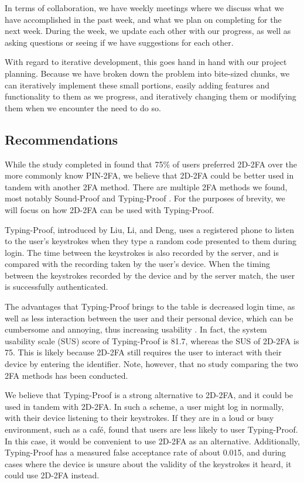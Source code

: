 \documentclass[11pt]{article}
\begin{document}
In terms of collaboration, we have weekly meetings where we discuss what
we have accomplished in the past week, and what we plan on completing
for the next week. During the week, we update each other with our
progress, as well as asking questions or seeing if we have suggestions
for each other. 

With regard to iterative development, this goes hand in hand with our
project planning. Because we have broken down the problem into
bite-sized chunks, we can iteratively implement these small portions,
easily adding features and functionality to them as we progress, and
iteratively changing them or modifying them when we encounter the need
to do so.

\subsection{Recommendations}

While the study completed in \cite{shirvanian2d2fa} found that 75\% of
users preferred 2D-2FA over the more commonly know PIN-2FA, we believe
that 2D-2FA could be better used in tandem with another 2FA method.
There are multiple 2FA methods we found, most notably Sound-Proof
\cite{soundProof} and Typing-Proof \cite{liuTypingProof}. For the
purposes of brevity, we will focus on how 2D-2FA can be used with
Typing-Proof. 

Typing-Proof, introduced by Liu, Li, and Deng, uses a registered phone
to listen to the user's keystrokes when they type a random code
presented to them during login. The time between the keystrokes is also
recorded by the server, and is compared with the recording taken by the
user's device. When the timing between the keystrokes recorded by the
device and by the server match, the user is successfully authenticated. 

The advantages that Typing-Proof brings to the table is decreased login
time, as well as less interaction between the user and their personal
device, which can be cumbersome and annoying, thus increasing usability
\cite{liuTypingProof}. In fact, the system usability scale (SUS) score
of Typing-Proof is 81.7, whereas the SUS of 2D-2FA is 75. This is likely
because 2D-2FA still requires the user to interact with their device by
entering the identifier. Note, however, that no study comparing the two
2FA methods has been conducted.  

We believe that Typing-Proof is a strong alternative to 2D-2FA, and it
could be used in tandem with 2D-2FA. In such a scheme, a user might
log in normally, with their device listening to their keystrokes. If
they are in a loud or busy environment, such as a caf\'e,
\cite{liuTypingProof} found that users are less likely to user
Typing-Proof. In this case, it would be convenient to use 2D-2FA as an
alternative. Additionally, Typing-Proof has a measured false acceptance
rate of about 0.015, and during cases where the device is unsure about
the validity of the keystrokes it heard, it could use 2D-2FA instead.
\end{document}
